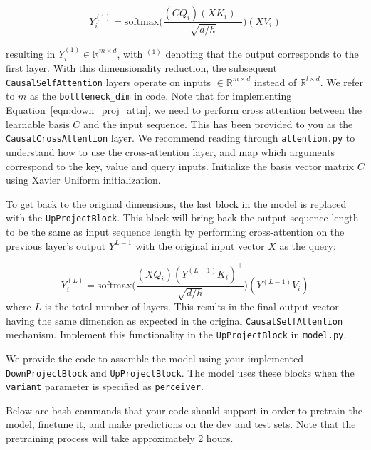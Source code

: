 \begin{parts}
\begin{equation}\label{eqn:down_proj_attn}
Y_i^{(1)} = \text{softmax}\bigg(\frac{(CQ_i)(XK_i)^\top}{\sqrt{d/h}}\bigg)(XV_i)    
\end{equation}

resulting in $Y_i^{(1)} \in\mathbb{R}^{m\times d}$, with $^{(1)}$ denoting that the output corresponds to the first layer. With this dimensionality reduction, the subsequent \texttt{CausalSelfAttention} layers operate on inputs $\in \mathbb{R}^{m\times d}$ instead of $\mathbb{R}^{l\times d}$. We refer to $m$ as the \texttt{bottleneck\_dim} in code. Note that for implementing Equation~\ref{eqn:down_proj_attn}, we need to perform cross attention between the learnable basis $C$ and the input sequence. This has been provided to you as the \texttt{CausalCrossAttention} layer. We recommend reading through \texttt{attention.py} to understand how to use the cross-attention layer, and map which arguments correspond to the key, value and query inputs. Initialize the basis vector matrix $C$ using Xavier Uniform initialization.

To get back to the original dimensions, the last block in the model is replaced with the \texttt{UpProjectBlock}. This block will bring back the output sequence length to be the same as input sequence length  by performing cross-attention on the previous layer's output $Y^{L-1}$ with the original input vector $X$ as the query:

\begin{equation}\label{eqn:up_proj_attn}
Y_i^{(L)} = \text{softmax}\bigg(\frac{(XQ_i)(Y^{(L-1)}K_i)^\top}{\sqrt{d/h}}\bigg)(Y^{(L-1)}V_i)
\end{equation}
where $L$ is the total number of layers. This results in the final output vector having the same dimension as expected in the original \texttt{CausalSelfAttention} mechanism. Implement this functionality in the \texttt{UpProjectBlock} in \texttt{model.py}.



We provide the code to assemble the model using your implemented \texttt{DownProjectBlock} and \texttt{UpProjectBlock}. The model uses these blocks when the \texttt{variant} parameter is specified as \texttt{perceiver}.


Below are bash commands that your code should support in order to pretrain the model, finetune it, and make predictions on the dev and test sets.
Note that the pretraining process will take approximately 2 hours. 
\clearpage
\begin{lstlisting}[basicstyle=\ttfamily, language=bash]


\end{lstlisting}
\end{parts}
